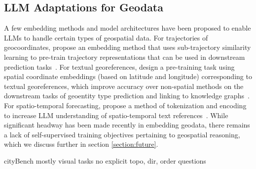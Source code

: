 \subsection{LLM Adaptations for Geodata}
A few embedding methods and model architectures have been proposed to enable LLMs to handle certain types of geospatial data.
%
For trajectories of geocoordinates, \citeauthor{Hu2023} propose an embedding method that uses sub-trajectory similarity learning to pre-train trajectory representations that can be used in downstream prediction tasks~\cite{Hu2023}.
%
For textual georeferences, \citeauthor{Li2021} design a pre-training task using spatial coordinate embeddings (based on latitude and longitude) corresponding to textual georeferences, which improve
 accuracy over non-spatial methods on the downstream tasks of geoentity type prediction and linking to knowledge graphs~\cite{Li2021}.
For spatio-temporal forecasting, \citeauthor{Liu2024large} propose a method of tokenization and encoding to increase LLM understanding of spatio-temporal text references~\cite{Liu2024large}.
While significant headway has been made recently in embedding geodata, there remains a lack of self-supervised training objectives pertaining to geospatial reasoning, which we discuss further in section \ref{section:future}.



 
\cite{Manvi2024}
\cite{Yu2025}
\cite{Li2024}
\cite{Lietard2021}
\cite{Majic2024}
\cite{Roberts2023}
\cite{Chen2024}
\cite{Sharma2023}
\cite{Li2023b}
\cite{Feng2024b} cityBench mostly visual tasks no explicit topo, dir, order questions




